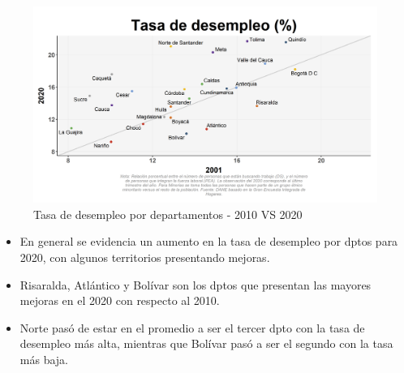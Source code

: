     \begin{figure}[H]
        \caption{Tasa de desempleo por departamentos - 2010 VS 2020 \label{map_result_2} }
        \begin{center}
        \includegraphics[width=\textwidth,keepaspectratio]{img/var_47_scatter_time.png}
        \end{center}
    \end{figure}
            \begin{itemize}
                \item En general se evidencia un aumento en la tasa de desempleo por dptos para 2020, con algunos territorios presentando mejoras.
                \item Risaralda, Atlántico y Bolívar son los dptos que presentan las mayores mejoras en el 2020 con respecto al 2010.
                \item Norte pasó de estar en el promedio a ser el tercer dpto con la tasa de desempleo más alta, mientras que Bolívar pasó a ser el segundo con la tasa más baja.
                \end{itemize}

